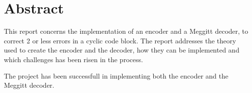 \documentclass[Main]{subfiles}
\begin{document}
\section{Abstract}

This report concerns the implementation of an encoder and a Meggitt decoder, to correct 2 or less errors in a cyclic code block.
The report addresses the theory used to create the encoder and the decoder, how they can be implemented and which challenges has been risen in the process.

The project has been successfull in implementing both the encoder and the Meggitt decoder.
\end{document}
